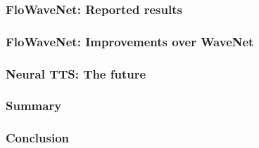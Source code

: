\documentclass{beamer}
\begin{document}
  \begin{frame}
    \frametitle{FloWaveNet: Reported results}
  \end{frame}

  \begin{frame}
    \frametitle{FloWaveNet: Improvements over WaveNet}
  \end{frame}

  \begin{frame}
    \frametitle{Neural TTS: The future}
  \end{frame}

  \begin{frame}
    \frametitle{Summary}
  \end{frame}

  \begin{frame}
    \frametitle{Conclusion}
  \end{frame}
  
\end{document}
